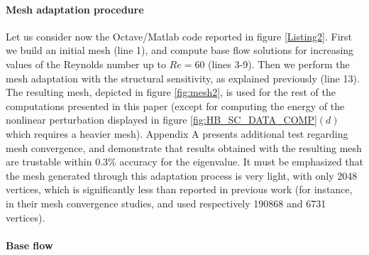 \documentclass[twocolumn,10pt]{asme2ej}
\begin{document}
\paragraph{Mesh adaptation procedure}

Let us consider now the Octave/Matlab code reported in figure \ref{Listing2}. First we build an initial mesh (line 1), and compute base flow solutions for increasing values of the Reynolds number up to $Re = 60$ (lines 3-9).
Then we perform the mesh adaptation with the structural sensitivity, as explained previously (line 13). 
The resulting mesh, depicted in figure \ref{fig:mesh2}, is used for the rest of the computations presented in this paper (except for computing
the energy of the nonlinear perturbation displayed in figure \ref{fig:HB_SC_DATA_COMP}$(d)$ which requires a heavier mesh). 
Appendix A presents additional test regarding mesh convergence, and demonstrate that results obtained with the resulting mesh are trustable within $0.3\%$ accuracy for the eigenvalue. It must be emphasized  that the mesh generated through this adaptation process is very light, with only 2048 vertices, which is significantly less than reported in previous work (for instance, in their mesh convergence studies, \cite{SippLebedev} and \cite{MLugo2014} used respectively 190868  and 6731 vertices).










\paragraph{Base flow}
\end{document}

